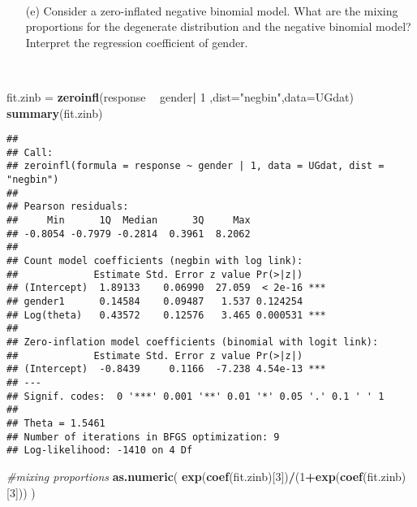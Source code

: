\documentclass[]{article}
\newenvironment{Shaded}{\begin{snugshade}}{\end{snugshade}}
\newcommand{\KeywordTok}[1]{\textcolor[rgb]{0.13,0.29,0.53}{\textbf{#1}}}
\newcommand{\DataTypeTok}[1]{\textcolor[rgb]{0.13,0.29,0.53}{#1}}
\newcommand{\DecValTok}[1]{\textcolor[rgb]{0.00,0.00,0.81}{#1}}
\newcommand{\StringTok}[1]{\textcolor[rgb]{0.31,0.60,0.02}{#1}}
\newcommand{\CommentTok}[1]{\textcolor[rgb]{0.56,0.35,0.01}{\textit{#1}}}
\newcommand{\OperatorTok}[1]{\textcolor[rgb]{0.81,0.36,0.00}{\textbf{#1}}}
\newcommand{\NormalTok}[1]{#1}
\begin{document}
~

\begin{itemize}
     \item[(e)] Consider a zero-inflated negative binomial model. What are the mixing proportions for the degenerate distribution and the negative binomial model? Interpret the regression coefficient of gender.

 \end{itemize}

~

\begin{Shaded}
\begin{Highlighting}[]
\NormalTok{fit.zinb =}\StringTok{ }\KeywordTok{zeroinfl}\NormalTok{(response }\OperatorTok{~}\StringTok{ }\NormalTok{gender}\OperatorTok{|}\StringTok{ }\DecValTok{1}\NormalTok{ ,}\DataTypeTok{dist=}\StringTok{"negbin"}\NormalTok{,}\DataTypeTok{data=}\NormalTok{UGdat)}
\KeywordTok{summary}\NormalTok{(fit.zinb)}
\end{Highlighting}
\end{Shaded}

\begin{verbatim}
## 
## Call:
## zeroinfl(formula = response ~ gender | 1, data = UGdat, dist = "negbin")
## 
## Pearson residuals:
##     Min      1Q  Median      3Q     Max 
## -0.8054 -0.7979 -0.2814  0.3961  8.2062 
## 
## Count model coefficients (negbin with log link):
##             Estimate Std. Error z value Pr(>|z|)    
## (Intercept)  1.89133    0.06990  27.059  < 2e-16 ***
## gender1      0.14584    0.09487   1.537 0.124254    
## Log(theta)   0.43572    0.12576   3.465 0.000531 ***
## 
## Zero-inflation model coefficients (binomial with logit link):
##             Estimate Std. Error z value Pr(>|z|)    
## (Intercept)  -0.8439     0.1166  -7.238 4.54e-13 ***
## ---
## Signif. codes:  0 '***' 0.001 '**' 0.01 '*' 0.05 '.' 0.1 ' ' 1 
## 
## Theta = 1.5461 
## Number of iterations in BFGS optimization: 9 
## Log-likelihood: -1410 on 4 Df
\end{verbatim}

\begin{Shaded}
\begin{Highlighting}[]
\CommentTok{#mixing proportions}
\KeywordTok{as.numeric}\NormalTok{( }\KeywordTok{exp}\NormalTok{(}\KeywordTok{coef}\NormalTok{(fit.zinb)[}\DecValTok{3}\NormalTok{])}\OperatorTok{/}\NormalTok{(}\DecValTok{1}\OperatorTok{+}\KeywordTok{exp}\NormalTok{(}\KeywordTok{coef}\NormalTok{(fit.zinb)[}\DecValTok{3}\NormalTok{])) )}
\end{Highlighting}
\end{Shaded}
\end{document}
